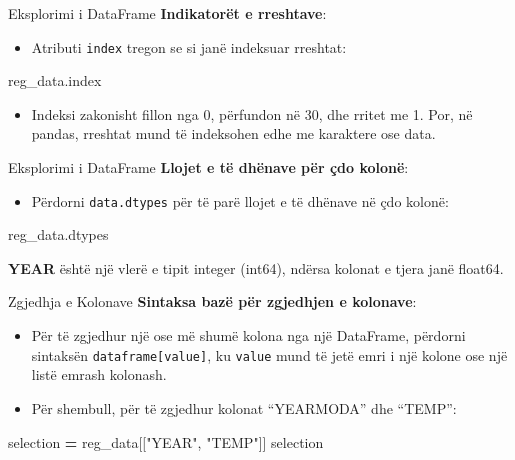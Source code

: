 \documentclass[
  ignorenonframetext,
]{beamer}
\newenvironment{Shaded}{\begin{snugshade}}{\end{snugshade}}
\newcommand{\NormalTok}[1]{#1}
\newcommand{\OperatorTok}[1]{\textcolor[rgb]{0.81,0.36,0.00}{\textbf{#1}}}
\newcommand{\StringTok}[1]{\textcolor[rgb]{0.31,0.60,0.02}{#1}}
\providecommand{\tightlist}{%
  \setlength{\itemsep}{0pt}\setlength{\parskip}{0pt}}
\begin{document}
\begin{frame}[fragile]{Eksplorimi i DataFrame}
\protect\hypertarget{eksplorimi-i-dataframe-3}{}
\textbf{Indikatorët e rreshtave}:

\begin{itemize}
\tightlist
\item
  Atributi \texttt{index} tregon se si janë indeksuar rreshtat:
\end{itemize}

\begin{Shaded}
\begin{Highlighting}[]
\NormalTok{    reg\_data.index}
\end{Highlighting}
\end{Shaded}

\begin{itemize}
\tightlist
\item
  Indeksi zakonisht fillon nga 0, përfundon në 30, dhe rritet me 1. Por,
  në pandas, rreshtat mund të indeksohen edhe me karaktere ose data.
\end{itemize}
\end{frame}

\begin{frame}[fragile]{Eksplorimi i DataFrame}
\protect\hypertarget{eksplorimi-i-dataframe-4}{}
\textbf{Llojet e të dhënave për çdo kolonë}:

\begin{itemize}
\tightlist
\item
  Përdorni \texttt{data.dtypes} për të parë llojet e të dhënave në çdo
  kolonë:
\end{itemize}

\begin{Shaded}
\begin{Highlighting}[]
\NormalTok{    reg\_data.dtypes}
\end{Highlighting}
\end{Shaded}

\textbf{YEAR} është një vlerë e tipit integer (int64), ndërsa kolonat e
tjera janë float64.
\end{frame}

\begin{frame}[fragile]{Zgjedhja e Kolonave}
\protect\hypertarget{zgjedhja-e-kolonave}{}
\textbf{Sintaksa bazë për zgjedhjen e kolonave}:

\begin{itemize}
\item
  Për të zgjedhur një ose më shumë kolona nga një DataFrame, përdorni
  sintaksën \texttt{dataframe{[}value{]}}, ku \texttt{value} mund të
  jetë emri i një kolone ose një listë emrash kolonash.
\item
  Për shembull, për të zgjedhur kolonat ``YEARMODA'' dhe ``TEMP'':
\end{itemize}

\begin{Shaded}
\begin{Highlighting}[]
\NormalTok{    selection }\OperatorTok{=}\NormalTok{ reg\_data[[}\StringTok{"YEAR"}\NormalTok{, }\StringTok{"TEMP"}\NormalTok{]]}
\NormalTok{    selection}
\end{Highlighting}
\end{Shaded}
\end{frame}
\end{document}
